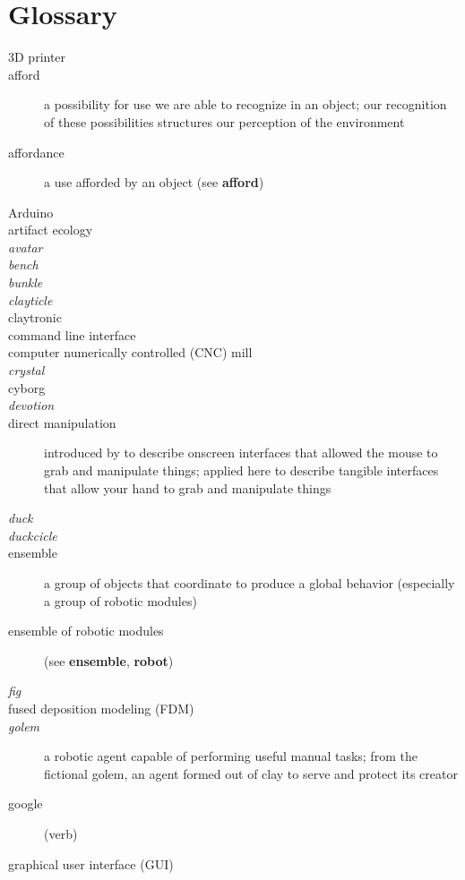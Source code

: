 \chapter{Glossary}
%
\begin{description}
%
\item[3D printer]
%
\item[afford] a possibility for use we are able to recognize in an object; our recognition of these possibilities structures our perception of the environment \citep{gibson_1979}
%
\item[affordance] a use afforded by an object (see {\bf afford})
%
\item[Arduino]
%
\item[artifact ecology]
%
\item[\emph{avatar}]
%
\item[\emph{bench}]
%
\item[\emph{bunkle}]
%
\item[\emph{clayticle}]
%
\item[claytronic]
%
\item[command line interface]
%
\item[computer numerically controlled (CNC) mill]
%
\item[\emph{crystal}]
%
\item[cyborg]
%
\item[\emph{devotion}]
%
\item[direct manipulation] introduced by \citet{shneiderman_computer1983} to describe onscreen interfaces that allowed the mouse to grab and manipulate things; applied here to describe tangible interfaces that allow your hand to grab and manipulate things
%
\item[\emph{duck}]
%
\item[\emph{duckcicle}]
%
\item[ensemble] a group of objects that coordinate to produce a global behavior (especially a group of robotic modules)
%
\item[ensemble of robotic modules] (see {\bf ensemble}, {\bf robot})
%
\item[\emph{fig}]
%
\item[fused deposition modeling (FDM)]
%
\item[\emph{golem}] a robotic agent capable of performing useful manual tasks; from the fictional golem, an agent formed out of clay to serve and protect its creator
%
\item[google] (verb)
%
\item[graphical user interface (GUI)]

\end{description}
